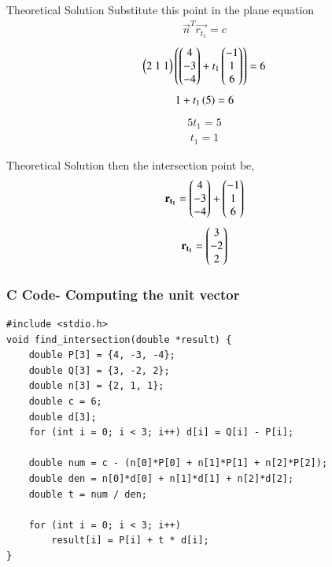 \documentclass{beamer}
\begin{document}
\begin{frame}{Theoretical Solution}
Substitute this point in the plane equation 
         \begin{align}
             \vec{n}^T\vec{r_{t_1}}=c
         \end{align}
    \begin{align}
             \begin{pmatrix}2\;1\;1\end{pmatrix}\left(\begin{pmatrix}4\\-3\\-4\end{pmatrix}+t_1\begin{pmatrix}-1\\1\\6\end{pmatrix}\right)=6
         \end{align}
         \begin{align}
             1+t_1\left(5\right)=6
         \end{align}
         \begin{align}
             5t_1=5
         \end{align}
         \begin{align}
             t_1=1
         \end{align}
         
\end{frame}
\begin{frame}{Theoretical Solution}
    then the intersection point be,
         \begin{align}
             \mathbf{r_{t_1}}=\begin{pmatrix}4\\-3\\-4\end{pmatrix}+\begin{pmatrix}-1\\1\\6\end{pmatrix}
         \end{align}
         \begin{align}
             \mathbf{r_{t_1}}=\begin{pmatrix}3\\-2\\2\end{pmatrix}
         \end{align}
\end{frame}
	\begin{frame}[fragile]
	\frametitle{C Code- Computing the unit vector}
	
	\begin{lstlisting}
#include <stdio.h>
void find_intersection(double *result) {
    double P[3] = {4, -3, -4};
    double Q[3] = {3, -2, 2};
    double n[3] = {2, 1, 1};
    double c = 6;
    double d[3];
    for (int i = 0; i < 3; i++) d[i] = Q[i] - P[i];

    double num = c - (n[0]*P[0] + n[1]*P[1] + n[2]*P[2]);
    double den = n[0]*d[0] + n[1]*d[1] + n[2]*d[2];
    double t = num / den;

    for (int i = 0; i < 3; i++)
        result[i] = P[i] + t * d[i];
}

	\end{lstlisting}
\end{frame}
\end{document}
